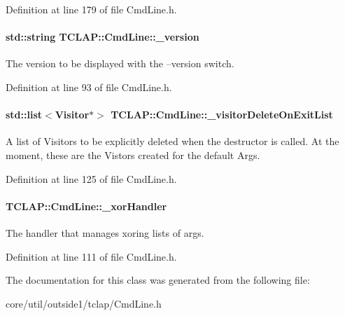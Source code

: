 Definition at line 179 of file Cmd\+Line.\+h.

\paragraph[{\texorpdfstring{\+\_\+version}{_version}}]{\setlength{\rightskip}{0pt plus 5cm}std\+::string T\+C\+L\+A\+P\+::\+Cmd\+Line\+::\+\_\+version\hspace{0.3cm}{\ttfamily [protected]}}\hypertarget{classTCLAP_1_1CmdLine_a2b2b52fffed2dcb7df3cdfc582ec8fd1}{}\label{classTCLAP_1_1CmdLine_a2b2b52fffed2dcb7df3cdfc582ec8fd1}
The version to be displayed with the --version switch. 

Definition at line 93 of file Cmd\+Line.\+h.

\paragraph[{\texorpdfstring{\+\_\+visitor\+Delete\+On\+Exit\+List}{_visitorDeleteOnExitList}}]{\setlength{\rightskip}{0pt plus 5cm}std\+::list$<${\bf Visitor}$\ast$$>$ T\+C\+L\+A\+P\+::\+Cmd\+Line\+::\+\_\+visitor\+Delete\+On\+Exit\+List\hspace{0.3cm}{\ttfamily [protected]}}\hypertarget{classTCLAP_1_1CmdLine_a79b8a947f8100de977574b45b91117ac}{}\label{classTCLAP_1_1CmdLine_a79b8a947f8100de977574b45b91117ac}
A list of Visitors to be explicitly deleted when the destructor is called. At the moment, these are the Vistors created for the default Args. 

Definition at line 125 of file Cmd\+Line.\+h.

\paragraph[{\texorpdfstring{\+\_\+xor\+Handler}{_xorHandler}}]{ T\+C\+L\+A\+P\+::\+Cmd\+Line\+::\+\_\+xor\+Handler\hspace{0.3cm}{\ttfamily [protected]}}\hypertarget{classTCLAP_1_1CmdLine_a33846aa10c62ecd61640c93c16ac315d}{}\label{classTCLAP_1_1CmdLine_a33846aa10c62ecd61640c93c16ac315d}
The handler that manages xoring lists of args. 

Definition at line 111 of file Cmd\+Line.\+h.



The documentation for this class was generated from the following file\+:\begin{DoxyCompactItemize}
\item 
core/util/outside1/tclap/Cmd\+Line.\+h\end{DoxyCompactItemize}
